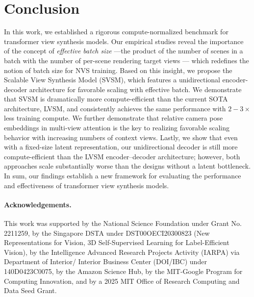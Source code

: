\section{Conclusion}
\label{sec:conclusion}
%
In this work, we established a rigorous compute-normalized benchmark for transformer view synthesis models.
%
 Our empirical studies reveal the importance of the concept of \emph{effective batch size} ---the product of the number of scenes in a batch with the number of per-scene rendering target views --- which redefines the notion of batch size for NVS training.
%
Based on this insight, we propose the Scalable View Synthesis Model (SVSM), which features a unidirectional encoder-decoder architecture for favorable scaling with effective batch. We demonstrate that SVSM is dramatically more compute-efficient than the current SOTA architecture, LVSM, and consistently achieves the same performance with $2-3\times$ less training compute.
%
We further demonstrate that relative camera pose embeddings in multi-view attention is the key to realizing favorable scaling behavior with increasing numbers of context views. 
%
Lastly, we show that even with a fixed-size latent representation, our unidirectional decoder is still more compute-efficient than the LVSM encoder–decoder architecture; however, both approaches scale substantially worse than the designs without a latent bottleneck.
%
In sum, our findings establish a new framework for evaluating the performance and effectiveness of transformer view synthesis models.  

\paragraph{Acknowledgements.} This work was supported by the National Science Foundation under Grant No. 2211259, by the Singapore DSTA under DST00OECI20300823 (New Representations for Vision, 3D Self-Supervised Learning for Label-Efficient Vision), by the Intelligence Advanced Research Projects Activity (IARPA) via Department of Interior/ Interior Business Center (DOI/IBC) under 140D0423C0075, by the Amazon Science Hub, by the MIT-Google Program for Computing Innovation, and by a 2025 MIT Office of Research Computing and Data Seed Grant.
